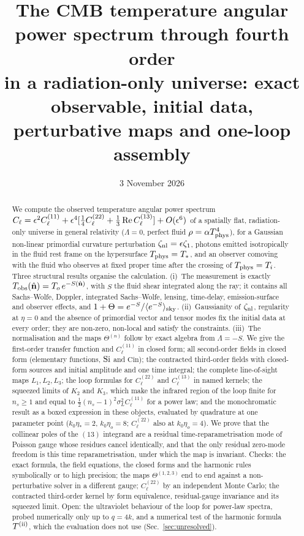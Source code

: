 \documentclass[11pt]{article}
\title{The CMB temperature angular power spectrum through fourth order\\
in a radiation-only universe: exact observable, initial data,\\
perturbative maps and one-loop assembly}
\author{}
\date{3 November 2026}
\theoremstyle{plain}
\theoremstyle{definition}
\theoremstyle{remark}
\begin{document}
\maketitle

\begin{abstract}
We compute the observed temperature angular power spectrum
$C_\ell=\epsilon^2C_\ell^{(11)}+\epsilon^4[\tfrac14C_\ell^{(22)}+\tfrac13\operatorname{Re} C_\ell^{(13)}]+O(\epsilon^6)$
of a spatially flat, radiation-only universe in general relativity ($\Lambda=0$, perfect fluid $\rho=\alpha T_{\rm phys}^4$), for a
Gaussian non-linear primordial curvature perturbation $\zeta_{\rm nl}=\epsilon\zeta_1$, photons emitted isotropically in the fluid
rest frame on the hypersurface $T_{\rm phys}=T_*$, and an observer comoving with the fluid who observes at fixed proper time after
the crossing of $T_{\rm phys}=T_i$.  Three structural results organise the calculation.  (i)~The measurement is exactly
$T_{\rm obs}(\hat{\mathbf n})=T_o\,e^{-S(\hat{\mathbf n})}$, with $S$ the fluid shear integrated along the ray; it contains all Sachs--Wolfe, Doppler,
integrated Sachs--Wolfe, lensing, time-delay, emission-surface and observer effects, and $1+\Theta=e^{-S}/\langle e^{-S}\rangle_{\rm sky}$.
(ii)~Gaussianity of $\zeta_{\rm nl}$, regularity at $\eta=0$ and the absence of primordial vector and tensor modes fix the initial data at
every order; they are non-zero, non-local and satisfy the constraints.  (iii)~The normalisation and the maps $\Theta^{(n)}$ follow by exact
algebra from $\Lambda=-S$.  We give the first-order transfer function and $C^{(11)}_\ell$ in closed form; all second-order fields in closed
form (elementary functions, $\operatorname{Si}$ and $\mathrm{Cin}$); the contracted third-order fields with closed-form sources and initial amplitude and one
time integral; the complete line-of-sight maps $L_1,L_2,L_3$; the loop formulas for $C^{(22)}_\ell$ and $C^{(13)}_\ell$ in named kernels; the
squeezed limits of $K_2$ and $K_3$, which make the infrared region of the loop finite for $n_s\ge1$ and equal to $\tfrac12(n_s-1)^2\sigma_L^2C^{(11)}_\ell$
for a power law; and the monochromatic result as a boxed expression in these objects, evaluated by quadrature at one parameter point
($k_0\eta_*=2$, $k_0\eta_o=8$; $C^{(22)}_\ell$ also at $k_0\eta_o=4$).  We prove that the collinear poles of the $(13)$ integrand are a residual
time-reparametrisation mode of Poisson gauge whose residues cancel identically, and that the only residual zero-mode freedom is this time
reparametrisation, under which the map is invariant.  Checks: the exact formula, the field equations, the closed forms and the harmonic rules
symbolically or to high precision; the maps $\Theta^{(1,2,3)}$ end to end against a non-perturbative solver in a different gauge; $C^{(22)}_\ell$ by
an independent Monte Carlo; the contracted third-order kernel by form equivalence, residual-gauge invariance and its squeezed limit.  Open: the
ultraviolet behaviour of the loop for power-law spectra, probed numerically only up to $q=4k$, and a numerical test of the harmonic formula $T^{\rm(ii)}$,
which the evaluation does not use (Sec.~\ref{sec:unresolved}).
\end{abstract}
\end{document}
